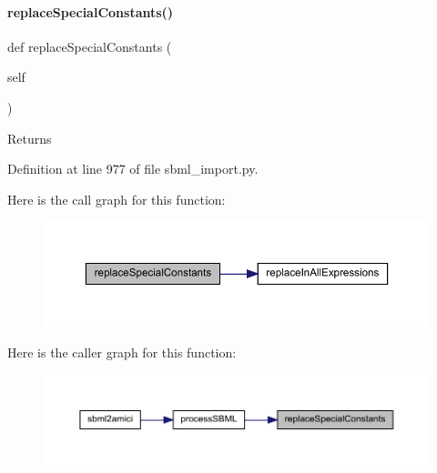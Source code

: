 \paragraph{\texorpdfstring{replaceSpecialConstants()}{replaceSpecialConstants()}}
{\footnotesize\ttfamily def replace\+Special\+Constants (\begin{DoxyParamCaption}\item[{}]{self }\end{DoxyParamCaption})}

\begin{DoxyReturn}{Returns}

\end{DoxyReturn}


Definition at line 977 of file sbml\+\_\+import.\+py.

Here is the call graph for this function\+:
\nopagebreak
\begin{figure}[H]
\begin{center}
\leavevmode
\includegraphics[width=350pt]{classamici_1_1sbml__import_1_1_sbml_importer_a5348e7b5041334f8c54b45c5c928dea0_cgraph}
\end{center}
\end{figure}
Here is the caller graph for this function\+:
\nopagebreak
\begin{figure}[H]
\begin{center}
\leavevmode
\includegraphics[width=350pt]{classamici_1_1sbml__import_1_1_sbml_importer_a5348e7b5041334f8c54b45c5c928dea0_icgraph}
\end{center}
\end{figure}
